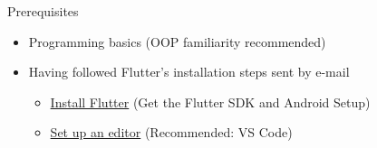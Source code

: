 \begin{frame}{Prerequisites}
    \begin{itemize}
        \item Programming basics (OOP familiarity recommended)
        \item Having followed Flutter's installation steps sent by e-mail
        \begin{itemize}
            \item \href{https://docs.flutter.dev/get-started/install}{Install Flutter} (Get the Flutter SDK and Android Setup)
            \item \href{https://docs.flutter.dev/get-started/editor}{Set up an editor} (Recommended: VS Code)
        \end{itemize}
    \end{itemize}
\end{frame}